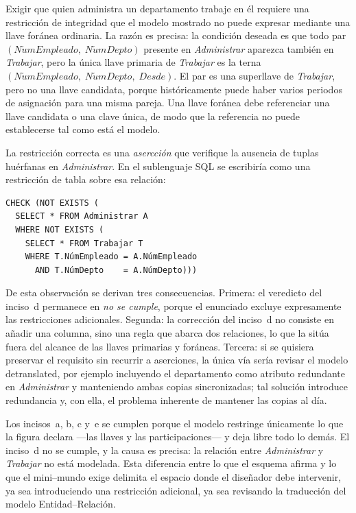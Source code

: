 Exigir que quien administra un departamento trabaje en él requiere una
restricción de integridad que el modelo mostrado no puede expresar mediante
una llave foránea ordinaria. La razón es precisa: la condición deseada es que
todo par $(\mathit{N\acute{u}mEmpleado},\; \mathit{N\acute{u}mDepto})$
presente en \emph{Administrar} aparezca también en \emph{Trabajar}, pero la
única llave primaria de \emph{Trabajar} es la terna
$(\mathit{N\acute{u}mEmpleado},\; \mathit{N\acute{u}mDepto},\;
\mathit{Desde})$. El par es una superllave de \emph{Trabajar}, pero no una
llave candidata, porque históricamente puede haber varios periodos de
asignación para una misma pareja. Una llave foránea debe referenciar una llave
candidata o una clave única, de modo que la referencia no puede establecerse
tal como está el modelo.

La restricción correcta es una \emph{asercción} que verifique la ausencia de
tuplas huérfanas en \emph{Administrar}. En el sublenguaje SQL se escribiría
como una restricción de tabla sobre esa relación:

\begin{verbatim}
CHECK (NOT EXISTS (
  SELECT * FROM Administrar A
  WHERE NOT EXISTS (
    SELECT * FROM Trabajar T
    WHERE T.NúmEmpleado = A.NúmEmpleado
      AND T.NúmDepto    = A.NúmDepto)))
\end{verbatim}

De esta observación se derivan tres consecuencias. Primera: el veredicto del
inciso~d permanece en \emph{no se cumple}, porque el enunciado excluye
expresamente las restricciones adicionales. Segunda: la corrección del
inciso~d no consiste en añadir una columna, sino una regla que abarca dos
relaciones, lo que la sitúa fuera del alcance de las llaves primarias y
foráneas. Tercera: si se quisiera preservar el requisito sin recurrir a
aserciones, la única vía sería revisar el modelo detranslated, por ejemplo
incluyendo el departamento como atributo redundante en \emph{Administrar} y
manteniendo ambas copias sincronizadas; tal solución introduce redundancia y,
con ella, el problema inherente de mantener las copias al día.

\begin{conceptobox}
Los incisos~a, b, c y~e se cumplen porque el modelo restringe únicamente lo
  que la figura declara ---las llaves y las participaciones--- y deja libre
  todo lo demás. El inciso~d no se cumple, y la causa es precisa: la relación
  entre \emph{Administrar} y \emph{Trabajar} no está modelada. Esta diferencia
  entre lo que el esquema afirma y lo que el mini--mundo exige delimita el
  espacio donde el diseñador debe intervenir, ya sea introduciendo una
  restricción adicional, ya sea revisando la traducción del modelo
  Entidad--Relación.
\end{conceptobox}
